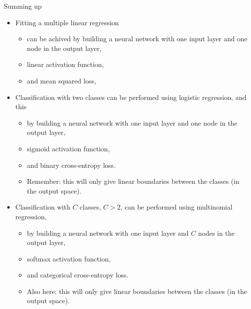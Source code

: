\documentclass[10pt,ignorenonframetext,]{beamer}
\providecommand{\tightlist}{%
  \setlength{\itemsep}{0pt}\setlength{\parskip}{0pt}}
\begin{document}
\begin{frame}

\begin{block}{Summing up}

\begin{itemize}
\tightlist
\item
  Fitting a multiple linear regression

  \begin{itemize}
  \tightlist
  \item
    can be achived by building a neural network with one input layer and
    one node in the output layer,
  \item
    linear activation function,
  \item
    and mean squared loss,
  \end{itemize}
\item
  Classification with two classes can be performed using logistic
  regression, and this

  \begin{itemize}
  \tightlist
  \item
    by building a neural network with one input layer and one node in
    the output layer,
  \item
    sigmoid activation function,
  \item
    and binary cross-entropy loss.
  \item
    Remember: this will only give linear boundaries between the classes
    (in the output space).
  \end{itemize}
\end{itemize}

\end{block}

\end{frame}

\begin{frame}

\begin{itemize}
\tightlist
\item
  Classification with \(C\) classes, \(C>2\), can be performed using
  multinomial regression,

  \begin{itemize}
  \tightlist
  \item
    by building a neural network with one input layer and \(C\) nodes in
    the output layer,
  \item
    softmax activation function,
  \item
    and categorical cross-entropy loss.
  \item
    Also here: this will only give linear boundaries between the classes
    (in the output space).
  \end{itemize}
\end{itemize}

\end{frame}
\end{document}
